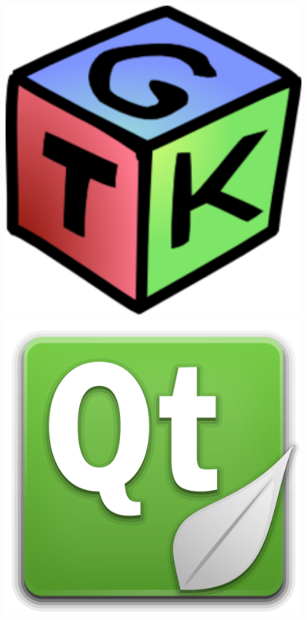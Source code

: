 \documentclass[a4paper, 11pt]{article}
\begin{document}
\begin{figure}[!ht] \centering
        \begin{minipage}[t]{4cm}
                \includegraphics[width=1\textwidth]{GTK.png}
        \end{minipage} 
        \begin{minipage}[t]{4cm}
                \includegraphics[width=1\textwidth]{Qtcreator_logo.png}
        \end{minipage}
\end{figure}
\end{document}
